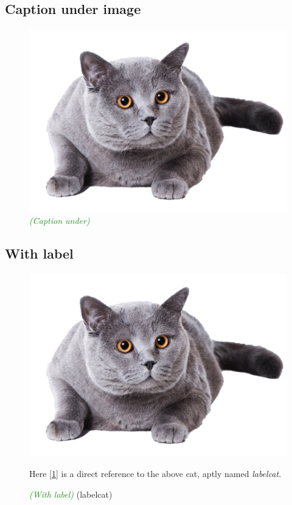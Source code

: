 \documentclass{article}
\newcommand{\ccheck}[1]{\textcolor{ForestGreen}{\emph{(\checkmark #1)}}} %
\begin{document}
\subsection{Caption under image}
\begin{figure}[H]
    \includegraphics[scale=0.3, angle=180]{catpng}
    \caption{\ccheck{Caption under}} %
\end{figure}

\subsection{With label}
\begin{figure}[H]
    \includegraphics[scale=0.3, angle=45]{catpng}
    \caption{\ccheck{With label} (labelcat)}
    \label{fig: labelcat}
Here [\ref{fig: labelcat}] is a direct reference to the above cat, aptly named \emph{labelcat}.
\end{figure}
\end{document}
